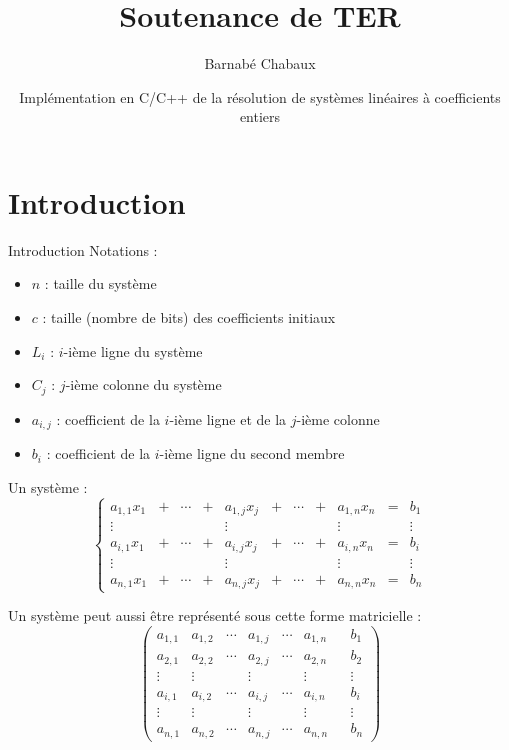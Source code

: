 \documentclass[11pt]{beamer}
\author{Barnabé Chabaux}
\title{Soutenance de TER}
\date{Implémentation en C/C++ de la résolution de systèmes linéaires à coefficients entiers}
\begin{document}
	\begin{frame}
		\titlepage
		\tableofcontents
	\end{frame}
	
	\section{Introduction}
	\begin{frame}{Introduction}
		Notations :
		\begin{itemize}
			\item $n$ : taille du système
			\item $c$ : taille (nombre de bits) des coefficients initiaux
			\item $L_i$ : $i$-ième ligne du système
			\item $C_j$ : $j$-ième colonne du système
			\item $a_{i,j}$ : coefficient de la $i$-ième ligne et de la $j$-ième colonne
			\item $b_i$ : coefficient de la $i$-ième ligne du second membre
		\end{itemize}
		Un système :
		$$\left \{
		\begin{array}{ccccccccccc}
			a_{1,1} x_1 &+ &\cdots &+ &a_{1,j} x_j &+ &\cdots &+ &a_{1,n} x_n &= & b_1\\
			\vdots & & & & \vdots & & & & \vdots & & \vdots\\
			a_{i,1} x_1 &+ &\cdots &+ &a_{i,j} x_j &+ &\cdots &+ &a_{i,n} x_n &= & b_i\\
			\vdots & & & & \vdots & & & & \vdots & & \vdots\\
			a_{n,1} x_1 &+ &\cdots &+ &a_{n,j} x_j &+ &\cdots &+ &a_{n,n} x_n &= & b_n
		\end{array}
		\right.
		$$
	\end{frame}
	
	\begin{frame}
		Un système peut aussi être représenté sous cette forme matricielle :
		\newline
		\begin{equation*}
			\begin{pmatrix}
				a_{1,1} & a_{1,2} & \cdots & a_{1,j} & \cdots & a_{1,n}&&b_1\\
				a_{2,1} & a_{2,2} & \cdots & a_{2,j} & \cdots & a_{2,n}&&b_2\\
				\vdots  & \vdots  & & \vdots & & \vdots&&\vdots\\
				a_{i,1} & a_{i,2} & \cdots & a_{i,j} & \cdots & a_{i,n}&&b_i\\
				\vdots  & \vdots  &  & \vdots & &\vdots&&\vdots\\
				a_{n,1} & a_{n,2} & \cdots & a_{n,j} & \cdots & a_{n,n}&&b_n
			\end{pmatrix}
		\end{equation*}
	\end{frame}
	
\end{document}
